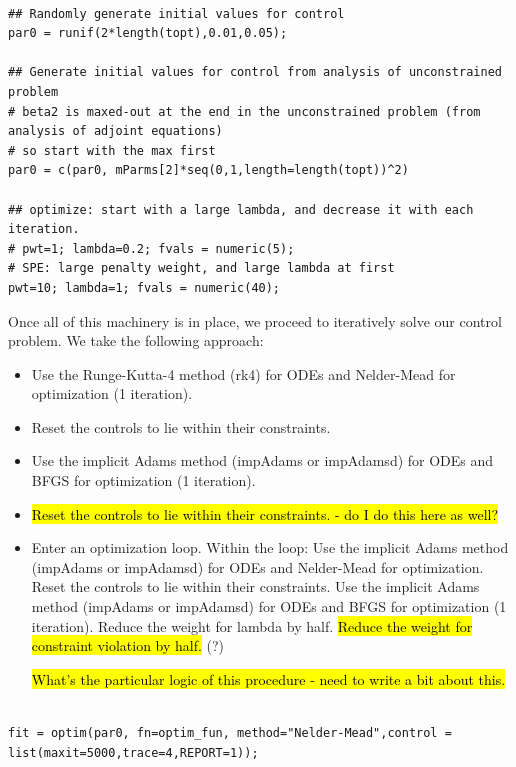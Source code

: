 \documentclass[12pt, oneside]{article}   	%
\begin{document}
\begin{lstlisting}

## Randomly generate initial values for control
par0 = runif(2*length(topt),0.01,0.05); 

## Generate initial values for control from analysis of unconstrained problem
# beta2 is maxed-out at the end in the unconstrained problem (from analysis of adjoint equations)   
# so start with the max first
par0 = c(par0, mParms[2]*seq(0,1,length=length(topt))^2) 

## optimize: start with a large lambda, and decrease it with each iteration. 
# pwt=1; lambda=0.2; fvals = numeric(5);  
# SPE: large penalty weight, and large lambda at first 
pwt=10; lambda=1; fvals = numeric(40);  

\end{lstlisting}

Once all of this machinery is in place, we proceed to iteratively solve our control problem. We take the following approach:

\begin{itemize}
\item Use the Runge-Kutta-4 method (rk4) for ODEs and Nelder-Mead for optimization (1 iteration).
\item Reset the controls to lie within their constraints.
\item Use the implicit Adams method (impAdams or impAdamsd) for ODEs and BFGS for optimization (1 iteration).
\item \hl{Reset the controls to lie within their constraints. - do I do this here as well?}
\item Enter an optimization loop. Within the loop:
\subitem Use the implicit Adams method (impAdams or impAdamsd) for ODEs and Nelder-Mead for optimization.
\subitem Reset the controls to lie within their constraints.
\subitem Use the implicit Adams method (impAdams or impAdamsd) for ODEs and BFGS for optimization (1 iteration).
\subitem Reduce the weight for lambda by half.
\subitem \hl{Reduce the weight for constraint violation by half.} (?)

\hl{What's the particular logic of this procedure - need to write a bit about this. }

\end{itemize}

\begin{lstlisting}

fit = optim(par0, fn=optim_fun, method="Nelder-Mead",control = list(maxit=5000,trace=4,REPORT=1));

\end{lstlisting}
\end{document}
